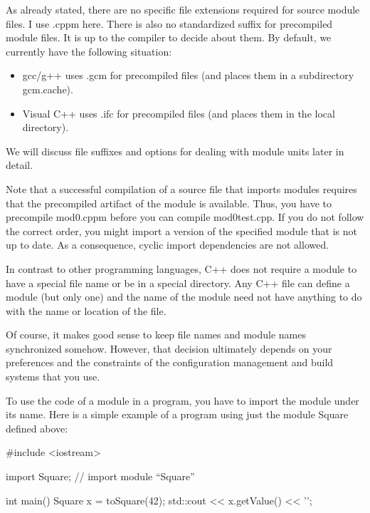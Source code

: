 As already stated, there are no specific file extensions required for source module files. I use .cppm here. There is also no standardized suffix for precompiled module files. It is up to the compiler to decide about them. By default, we currently have the following situation:

\begin{itemize}
\item 
gcc/g++ uses .gcm for precompiled files (and places them in a subdirectory gcm.cache).

\item
Visual C++ uses .ifc for precompiled files (and places them in the local directory).
\end{itemize}

We will discuss file suffixes and options for dealing with module units later in detail.

Note that a successful compilation of a source file that imports modules requires that the precompiled artifact of the module is available. Thus, you have to precompile mod0.cppm before you can compile mod0test.cpp. If you do not follow the correct order, you might import a version of the specified module that is not up to date. As a consequence, cyclic import dependencies are not allowed.

In contrast to other programming languages, C++ does not require a module to have a special file name or be in a special directory. Any C++ file can define a module (but only one) and the name of the module need not have anything to do with the name or location of the file.

Of course, it makes good sense to keep file names and module names synchronized somehow. However, that decision ultimately depends on your preferences and the constraints of the configuration management and build systems that you use.


To use the code of a module in a program, you have to import the module under its name. Here is a simple example of a program using just the module Square defined above:


\begin{cpp}
#include <iostream>

import Square; // import module “Square”

int main()
{
	Square x = toSquare(42);
	std::cout << x.getValue() << '\n';
}
\end{cpp}

